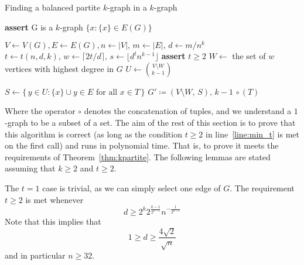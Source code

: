 \begin{algorithm}
    \caption{Finding a balanced partite $k$-graph in a $k$-graph}
    \label{alg:kpartite}
    \begin{algorithmic}[1]
            \State \textbf{assert} G is a $k$-graph
                \State \Return $\{x : \{x\} \in E(G)\}$
            \EndIf

            \State $V \gets V(G), E \gets E(G), n \gets |V|,\, m \gets |E|,\, d \gets m/n^k$
            \State $t \gets t(n, d, k),\, w \gets \lceil 2t/d \rceil,\, s \gets \lfloor d^t n^{k-1} \rfloor$ \label{line:tws}
            \State \textbf{assert} $t \geq 2$ \label{line:min_t}
            \State $W \gets$ the set of $w$ vertices with highest degree in $G$ \label{line:W}
            \State $U \gets \binom{V\setminus W}{k-1}$

             \label{line:for}
                \State $S \gets \{\,y \in U : \{x\} \cup y \in E \text{ for all } x \in T\,\}$
                    \State \Return {}
                    {$G' \coloneqq (V \setminus W,\, S),\, k-1$} $\circ \, (T)$\label{line:return}
                \EndIf
            \EndFor
        \EndFunction
    \end{algorithmic}
\end{algorithm}

Where the operator $\circ$ denotes the concatenation of tuples, and we
understand a $1$-graph to be a subset of a set.
The aim of the rest of this section is to prove that this algorithm is correct
(as long as the  condition $t \geq 2$ in line~\ref{line:min_t} is met on the first call)
and runs in polynomial time.
That is, to prove it meets the requirements of Theorem~\ref{thm:kpartite}.
The following lemmas are stated assuming that $k \geq 2$ and
$t \geq 2$.

\begin{remark}\label{rm:min_d}
    The $t=1$ case is trivial, as we can simply select one edge of $G$.
    The requirement $t \geq 2$ is met whenever
    \[
        d \geq 2^{k} 2^{\frac{k - 1}{2^{k-1}}} n^{-\frac{1}{2^{k-1}}}
    \]
    Note that this implies that
    \[
        1 \geq d \geq \frac{4\sqrt{2}}{\sqrt{n}}
    \]
    and in particular $n \geq 32$.
\end{remark}

